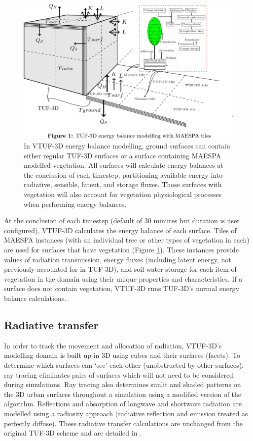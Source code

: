 \documentclass[final,3p,times,authoryear]{elsarticle}
\begin{document}
\begin{figure}[!htbp]
 \includegraphics[trim = 0mm 14mm 22mm 0.0mm, clip, scale=0.25]{images/TUFWithMaespaInsert.png}
 \caption{\label{fig:TUFWithMaespaInsert} In VTUF-3D energy balance modelling, ground surfaces can contain either regular TUF-3D surfaces or a surface containing MAESPA modelled vegetation. All surfaces will calculate energy balances at the conclusion of each timestep, partitioning available energy into radiative, sensible, latent, and storage fluxes. Those surfaces with vegetation will also account for vegetation physiological processes when performing energy balances.}
\end{figure}

At the conclusion of each timestep (default of 30 minutes but duration is user configured), VTUF-3D calculates the energy balance of each surface. Tiles of MAESPA instances (with an individual tree or other types of vegetation in each) are used for surfaces that have vegetation (Figure \ref{fig:TUFWithMaespaInsert}). These instances provide values of radiation transmission, energy fluxes (including latent energy, not previously accounted for in TUF-3D), and soil water storage for each item of vegetation in the domain using their unique properties and characteristics. If a surface does not contain vegetation, VTUF-3D runs TUF-3D's normal energy balance calculations.

\subsection{Radiative transfer}\label{sec:radiativetransfer}

In order to track the movement and allocation of radiation, VTUF-3D’s modelling domain is built up in 3D using cubes and their surfaces (facets). To determine which surfaces can `see' each other (unobstructed by other surfaces), ray tracing eliminates pairs of surfaces which will not need to be considered during simulations. Ray tracing also determines sunlit and shaded patterns on the 3D urban surfaces throughout a simulation using a modified version of the \cite{Soux2004} algorithm. Reflections and absorption of longwave and shortwave radiation are modelled using a radiosity approach (radiative reflection and emission treated as perfectly diffuse). These radiative transfer calculations are unchanged from the original TUF-3D scheme and are detailed in \cite{Krayenhoff2007}.
\end{document}
